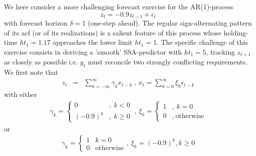 \documentclass[a4paper]{article}
\begin{document}
We here consider a more challenging forecast exercise for the AR(1)-process
\[z_t=-0.9z_{t-1}+\epsilon_t\]
with forecast horizon $\delta=1$ (one-step ahead). The regular sign-alternating pattern of its acf (or of its realizations) is a salient feature of this process whose holding-time $ht_1=1.17$ approaches the lower limit $ht_1=1$. The specific challenge of this exercise consists in deriving a 'smooth' SSA-predictor with $ht_1=5$, tracking $z_{t+1}$ as closely as possible i.e. $y_t$ must reconcile two strongly conflicting requirements. We first note that 
\begin{eqnarray*}
z_t&=&\sum_{k=-\infty}^{\infty}\gamma_k x_{t-k}~, ~x_t=\sum_{k=0}^{\infty}\xi_k\epsilon_{t-k}
\end{eqnarray*}
with either
\begin{eqnarray*}
\gamma_k=\left\{\begin{array}{cc}0&,~k<0\\(-0.9)^k&,~k\geq 0\end{array}\right.~,~\xi_k=\left\{\begin{array}{cc}1&,~k=0\\0&,~\textrm{otherwise}\end{array}\right.
\end{eqnarray*}
or 
\begin{eqnarray*}
\gamma_k=\left\{\begin{array}{cc}1&k=0\\0&\textrm{otherwise}\end{array}\right.,~\xi_k=(-0.9)^k,k\geq 0
\end{eqnarray*}
\end{document}
